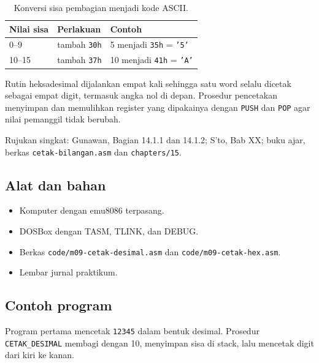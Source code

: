 \begin{table}[H]
    \centering
    \caption{Konversi sisa pembagian menjadi kode ASCII.}
    \label{tab:m09-digit}
    \small
    \begin{tabular}{@{}lll@{}}
        \toprule
        \textbf{Nilai sisa} & \textbf{Perlakuan} & \textbf{Contoh} \\
        \midrule
        0--9 & tambah \texttt{30h} & 5 menjadi \texttt{35h} = \texttt{'5'} \\
        10--15 & tambah \texttt{37h} & 10 menjadi \texttt{41h} = \texttt{'A'} \\
        \bottomrule
    \end{tabular}
\end{table}

Rutin heksadesimal dijalankan empat kali sehingga satu word selalu
dicetak sebagai empat digit, termasuk angka nol di depan. Prosedur
pencetakan menyimpan dan memulihkan register yang dipakainya dengan
\texttt{PUSH} dan \texttt{POP} agar nilai pemanggil tidak berubah.

\begin{rujukan}
Rujukan singkat: Gunawan, Bagian 14.1.1 dan 14.1.2; S'to, Bab XX;
buku ajar, berkas \texttt{cetak-bilangan.asm} dan \texttt{chapters/15}.
\end{rujukan}

\subsection{Alat dan bahan}

\begin{itemize}
    \item Komputer dengan emu8086 terpasang.
    \item DOSBox dengan TASM, TLINK, dan DEBUG.
    \item Berkas \texttt{code/m09-cetak-desimal.asm} dan
          \texttt{code/m09-cetak-hex.asm}.
    \item Lembar jurnal praktikum.
\end{itemize}

\subsection{Contoh program}

Program pertama mencetak \texttt{12345} dalam bentuk desimal.
Prosedur \texttt{CETAK\_DESIMAL} membagi dengan 10, menyimpan sisa di
stack, lalu mencetak digit dari kiri ke kanan.

